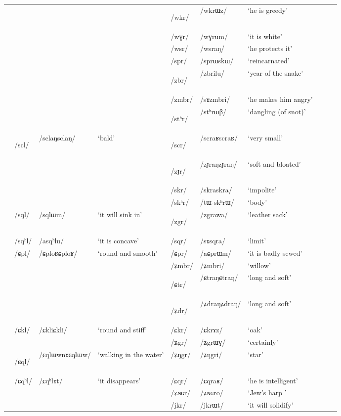 \documentclass[12pt]{article}
\newcommand{\ipa}[1]{\mbox{\phon/#1/}}
\newcommand{\trois}[1]{\ipa{#1}\addtocounter{3clusters}{1}}
\newcommand{\tib}[1]{\cellcolor{lightgray}\textbf{#1}}
\newcommand{\idph}[1]{\cellcolor{gray}\textbf{#1}}
\begin{document}
\begin{landscape}
\begin{longtable}{llllllllll}
\toprule
 & & & &\trois{wkr}  \tib{} & \ipa{wkrɯz} & `he is greedy' \\ 
 & & & &\trois{wɣr} &\ipa{wɣrum} & `it is white' \\ 
 & & & &\trois{wsr} &\ipa{wsraŋ} & `he protects it' \\ 
\midrule       
 & & & &\trois{spr} & \ipa{sprɯskɯ} & `reincarnated' \\ 
 & & & &\trois{zbr}  \tib{} & \ipa{zbrilu} & `year of the snake' \\ 
 & & & &\trois{zmbr} & \ipa{sɤzmbri} & `he makes him angry' \\ 
 & & & &\trois{stʰr}  \idph{} & \ipa{stʰrɯβ} & `dangling (of snot)' \\ 
 &\trois{scl}  \idph{} & \ipa{sclaŋsclaŋ} & `bald' &\trois{scr}  \idph{} & \ipa{scraʁscraʁ} & `very small' &\\
 & & & &\trois{zɟr} \idph{} & \ipa{zɟraŋzɟraŋ} & `soft and bloated' \\ 
 & & & &\trois{skr} & \ipa{skraskra} & `impolite' \\ 
 & & & &\trois{skʰr} & \ipa{tɯ-skʰrɯ} & `body' \\ 
 &\trois{sql} & \ipa{sqlɯm} & `it will sink in' &\trois{zgr} \tib{} & \ipa{zgrawa} & `leather sack' \\ 
 &\trois{sqʰl} & \ipa{asqʰlu} & `it is concave' &\trois{sqr} & \ipa{sɤsqra} & `limit' \\    
 &\trois{ɕpl} &\ipa{ɕploʁɕploʁ} & `round and smooth' &\trois{ɕpr} & \ipa{aɕprɯm} & `it is badly sewed' \\ 
 & & & &\trois{ʑmbr} & \ipa{ʑmbri} & `willow' \\ 
 & & & &\trois{ɕtr}  \idph{} & \ipa{ɕtraŋɕtraŋ} & `long and soft' \\ 
 & & & &\trois{ʑdr}  \idph{} & \ipa{ʑdraŋʑdraŋ} & `long and soft' \\ 
 &\trois{ɕkl} &\ipa{ɕkliɕkli} & `round and stiff' &\trois{ɕkr} & \ipa{ɕkrɤz} & `oak' \\ 
 & & & &\trois{ʑgr} & \ipa{ʑgrɯɣ} & `certainly' \\ 
 &\trois{ɕql}  \idph{} & \ipa{ɕqlɯwnɤɕqlɯw} & `walking in the water' &\trois{ʑŋgr} & \ipa{ʑŋgri} & `star' \\ 
 &\trois{ɕqʰl} & \ipa{ɕqʰlɤt} & `it disappears' &\trois{ɕqr} & \ipa{ɕqraʁ} & `he is intelligent' \\ 
 & & & & \trois{ʑɴɢr} & \ipa{ʑɴɢro} & `Jew's harp ' \\     
 & & & &\trois{jkr} & \ipa{jkrɯt} & `it will solidify' \\ 

\end{longtable}
\end{landscape}
\end{document}
